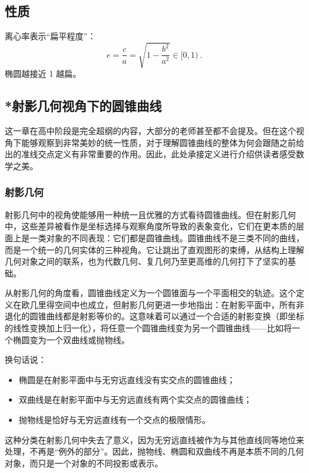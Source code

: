 \subsection{性质}

离心率表示“扁平程度”：
$$ e = \frac{c}{a} = \sqrt{1 - \frac{b^2}{a^2}} \in [0, 1) ~.$$
椭圆越接近 1 越扁。

\subsection{*射影几何视角下的圆锥曲线}\label{sub_HsCsFD_1}

这一章在高中阶段是完全超纲的内容，大部分的老师甚至都不会提及。但在这个视角下能够观察到非常美妙的统一性质，对于理解圆锥曲线的整体为何会跟随之前给出的准线交点定义有非常重要的作用。因此，此处承接定义进行介绍供读者感受数学之美。


\subsubsection{射影几何}



射影几何中的视角使能够用一种统一且优雅的方式看待圆锥曲线。但在射影几何中，这些差异被看作是坐标选择与观察角度所导致的表象变化，它们在更本质的层面上是一类对象的不同表现：它们都是圆锥曲线。圆锥曲线不是三类不同的曲线，而是一个统一的几何实体的三种视角。它让跳出了直观图形的束缚，从结构上理解几何对象之间的联系，也为代数几何、复几何乃至更高维的几何打下了坚实的基础。

从射影几何的角度看，圆锥曲线定义为一个圆锥面与一个平面相交的轨迹。这个定义在欧几里得空间中也成立，但射影几何更进一步地指出：在射影平面中，所有非退化的圆锥曲线都是射影等价的。这意味着可以通过一个合适的射影变换（即坐标的线性变换加上归一化），将任意一个圆锥曲线变为另一个圆锥曲线——比如将一个椭圆变为一个双曲线或抛物线。

换句话说：
\begin{itemize}
\item 椭圆是在射影平面中与无穷远直线没有实交点的圆锥曲线；
\item 双曲线是在射影平面中与无穷远直线有两个实交点的圆锥曲线；
\item 抛物线是恰好与无穷远直线有一个交点的极限情形。
\end{itemize}

这种分类在射影几何中失去了意义，因为无穷远直线被作为与其他直线同等地位来处理，不再是“例外的部分”。因此，抛物线、椭圆和双曲线不再是本质不同的几何对象，而只是一个对象的不同投影或表示。

